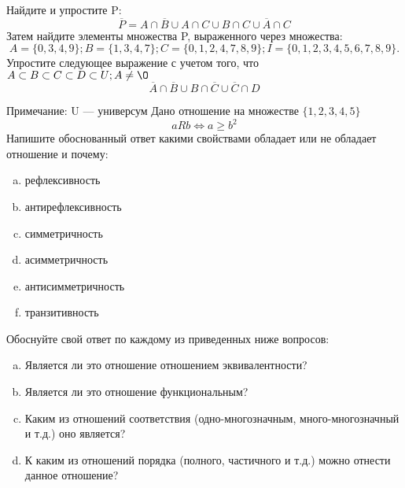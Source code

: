 \documentclass[10pt]{exam}
\begin{document}
\begin{questions}
\question
Найдите и упростите P:
\begin{equation*}
\overline{P} = A \cap \overline{B} \cup A \cap C \cup B \cap C \cup \overline{A} \cap C
\end{equation*}
Затем найдите элементы множества P, выраженного через множества:
\begin{equation*}
A = \{0, 3, 4, 9\}; 
B = \{1, 3, 4, 7\};
C = \{0, 1, 2, 4, 7, 8, 9\};
I = \{0, 1, 2, 3, 4, 5, 6, 7, 8, 9\}.
\end{equation*}\question
Упростите следующее выражение с учетом того, что $A\subset B \subset C \subset D \subset U; A \neq \O$
\begin{equation*}
\overline{A} \cap \overline{B} \cup B \cap \overline{C} \cup \overline{C} \cap D
\end{equation*}

Примечание: U — универсум\question
Дано отношение на множестве $\{1, 2, 3, 4, 5\}$ 
\begin{equation*}
aRb \iff a \geq b^2
\end{equation*}
Напишите обоснованный ответ какими свойствами обладает или не обладает отношение и почему:   
\begin{enumerate} [a)]\setcounter{enumi}{0}
\item рефлексивность
\item антирефлексивность
\item симметричность
\item асимметричность
\item антисимметричность
\item транзитивность
\end{enumerate}

Обоснуйте свой ответ по каждому из приведенных ниже вопросов:
\begin{enumerate} [a)]\setcounter{enumi}{0}
    \item Является ли это отношение отношением эквивалентности?
    \item Является ли это отношение функциональным?
    \item Каким из отношений соответствия (одно-многозначным, много-многозначный и т.д.) оно является?
    \item К каким из отношений порядка (полного, частичного и т.д.) можно отнести данное отношение?
\end{enumerate}



\end{questions}
\end{document}
